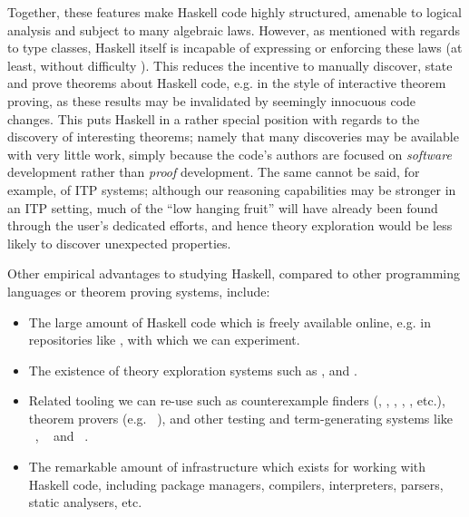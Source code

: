 Together, these features make Haskell code highly structured, amenable to
logical analysis and subject to many algebraic laws. However, as mentioned with
regards to type classes, Haskell itself is incapable of expressing or enforcing
these laws (at least, without difficulty \cite{lindley2014hasochism}). This
reduces the incentive to manually discover, state and prove theorems about
Haskell code, e.g. in the style of interactive theorem proving, as these results
may be invalidated by seemingly innocuous code changes. This puts Haskell in a
rather special position with regards to the discovery of interesting theorems;
namely that many discoveries may be available with very little work, simply
because the code's authors are focused on \emph{software} development rather
than \emph{proof} development. The same cannot be said, for example, of ITP
systems; although our reasoning capabilities may be stronger in an ITP setting,
much of the ``low hanging fruit'' will have already been found through the
user's dedicated efforts, and hence theory exploration would be less likely to
discover unexpected properties.

Other empirical advantages to studying Haskell, compared to other programming
languages or theorem proving systems, include:

\begin{itemize}
\item The large amount of Haskell code which is freely available online, e.g. in
  repositories like \hackage{}, with which we
  can experiment.

\item The existence of theory exploration systems such as \hipspec{},
  \quickspec{} and \speculate{}.

\item Related tooling we can re-use such as counterexample finders (\quickcheck{},
  \smallcheck{}, \smartcheck{}, \leancheck{},
  \hedgehog{}, etc.), theorem provers
  (e.g. \hip{}~\cite{rosen2012proving}), and other testing and
  term-generating systems like \mucheck{}~\cite{le2014mucheck},
  \magichaskeller{}~\cite{katayama2011magichaskeller} and
  \djinn{}~\cite{augustsson2005djinn}.

\item The remarkable amount of infrastructure which exists for working with
  Haskell code, including package managers, compilers, interpreters, parsers,
  static analysers, etc.
\end{itemize}

